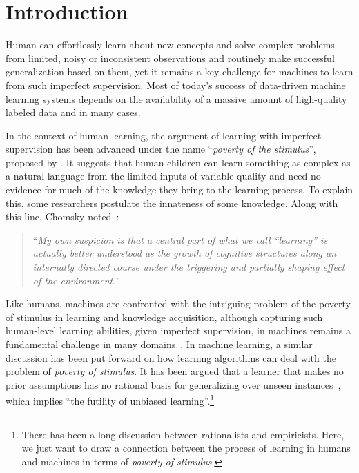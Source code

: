 \chapter{Introduction}
Human can effortlessly learn about new concepts and solve complex problems from limited, noisy or inconsistent observations and routinely make successful generalization based on them, yet it remains a key challenge for machines to learn from such imperfect supervision. Most of today's success of data-driven machine learning systems depends on the availability of a massive amount of high-quality labeled data and in many cases.

In the context of human learning, the argument of learning with imperfect supervision has been advanced under the name ``\emph{poverty of the stimulus}'', proposed by \citet{chomsky1980rules}. It suggests that human children can learn something as complex as a natural language from the limited inputs of variable quality and need no evidence for much of the knowledge they bring to the learning process. 
To explain this, some researchers postulate the innateness of some knowledge.
Along with this line, Chomsky noted~\citep{chomsky1980rules}:
\begin{quote}
    ``\emph{My own suspicion is that a central part of what we call “learning” is actually better understood as the growth of cognitive structures along an internally directed course under the triggering and partially shaping effect of the environment.}''
\end{quote}

Like humans, machines are confronted with the intriguing problem of the poverty of stimulus in learning and knowledge acquisition, although capturing such human-level learning abilities, given imperfect supervision, in machines remains a fundamental challenge in many domains~\citep{lake2017building}. 
%
In machine learning, a similar discussion has been put forward on how learning algorithms can deal with the problem of \emph{poverty of stimulus}. It has been argued that a learner that makes no prior assumptions has no rational basis for generalizing over unseen instances~\citep{Mitchell:1997:ML}, which implies ``the futility of unbiased learning''.\footnote{There has been a long discussion between rationalists and empiricists. Here, we just want to draw a connection between the process of learning in humans and machines in terms of \emph{poverty of stimulus}.}

